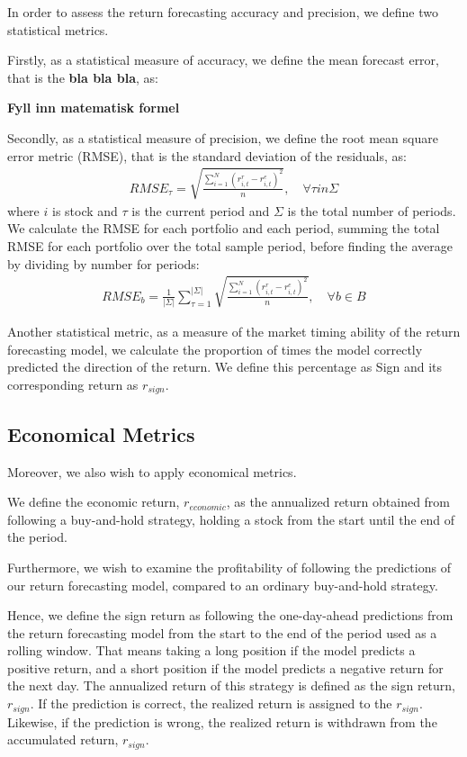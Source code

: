 In order to assess the return forecasting accuracy and precision, we define two statistical metrics.

Firstly, as a statistical measure of accuracy, we define the mean forecast error, that is the \textbf{bla bla bla}, as:

\textbf{Fyll inn matematisk formel}

Secondly, as a statistical measure of precision, we define the root mean square error metric (RMSE), that is the standard deviation of the residuals, as:
\begin{align}
    RMSE_{\tau} = \sqrt{\frac{\sum_{i=1}^{N}(r_{i,t}^{r} - r_{i,t}^{e})^{2}}{n}}, \quad \forall \tau in \Sigma
\end{align}
where $i$ is stock and $\tau$ is the current period and $\Sigma$ is the total number of periods. We calculate the RMSE for each portfolio and each period, summing the total RMSE for each portfolio over the total sample period, before finding the average by dividing by number for periods:
\begin{align}
    RMSE_{b} = \frac{1}{|\Sigma|}\sum_{\tau=1}^{|\Sigma|}\sqrt{\frac{\sum_{i=1}^{N}(r_{i,t}^{r} - r_{i,t}^{e})^{2}}{n}}, \quad \forall b \in B
\end{align}

Another statistical metric, as a measure of the market timing ability of the return forecasting model, we calculate the proportion of times the model correctly predicted the direction of the return. We define this percentage as Sign and its corresponding return as $r_{sign}$. 

\subsection{Economical Metrics}

Moreover, we also wish to apply economical metrics. 

We define the economic return, $r_{economic}$, as the annualized return obtained from following a buy-and-hold strategy, holding a stock from the start until the end of the period.

Furthermore, we wish to examine the profitability of following the predictions of our return forecasting model, compared to an ordinary buy-and-hold strategy. 

Hence, we define the sign return as following the one-day-ahead predictions from the return forecasting model from the start to the end of the period used as a rolling window. That means taking a long position if the model predicts a positive return, and a short position if the model predicts a negative return for the next day. The annualized return of this strategy is defined as the sign return, $r_{sign}$. If the prediction is correct, the realized return is assigned to the $r_{sign}$. Likewise, if the prediction is wrong, the realized return is withdrawn from the accumulated return, $r_{sign}$.


